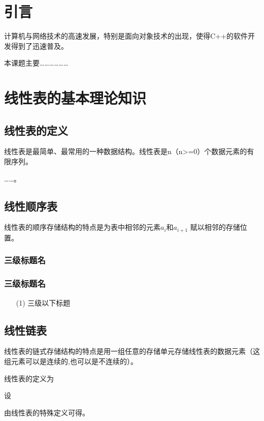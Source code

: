 

\section{引言}
计算机与网络技术的高速发展，特别是面向对象技术的出现，使得C++的软件开发得到了迅速普及。

本课题主要………………




\section{线性表的基本理论知识}
\subsection{线性表的定义}
线性表是最简单、最常用\cite{Rouse1974Monitoring}的一种数据结构。线性表\cite{贾永红2010数字图像处理}是n（n>=0）个数据元素的有限序列。

……。
\subsection{线性顺序表}
线性表的顺序存储结构的特点是为表中相邻的元素$a_i$和$a_{i+1}$ 赋以相邻的存储位置。
\subsubsection{三级标题名}
\subsubsection{三级标题名}
\begin{itemize}
        \item [(1)] 三级以下标题
\end{itemize}




\subsection{线性链表}

线性表的链式存储结构的特点是用一组任意的存储单元存储线性表的数据元素（这组元素可以是连续的,也可以是不连续的）。


\begin{mdef}
线性表的定义为
\end{mdef}


\begin{mthe}
设
\begin{mpro}
由线性表的特殊定义可得。
\end{mpro}
\end{mthe}


